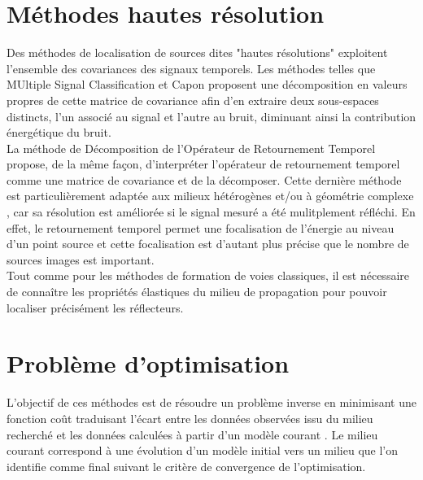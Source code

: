\section{Méthodes hautes résolution}


Des méthodes de localisation de sources dites "hautes résolutions" exploitent l'ensemble des covariances des signaux temporels. Les méthodes telles que MUltiple Signal Classification \citep{schmidt} et Capon \citep{capon} proposent une décomposition en valeurs propres de cette matrice de covariance afin d'en extraire deux sous-espaces distincts, l'un associé au signal et l'autre au bruit, diminuant ainsi la contribution énergétique du bruit. \\

La méthode de Décomposition de l'Opérateur de Retournement Temporel \citep{prada_dort} propose, de la même façon, d'interpréter l'opérateur de retournement temporel comme une matrice de covariance et de la décomposer. Cette dernière méthode est particulièrement adaptée aux milieux hétérogènes et/ou à géométrie complexe , car sa résolution est améliorée si le signal mesuré a été mulitplement réfléchi. En effet, le retournement temporel permet une focalisation de l'énergie au niveau d'un point source et cette focalisation est d'autant plus précise que le nombre de sources images est important. \\
  

Tout comme pour les méthodes de formation de voies classiques, il est nécessaire de connaître les propriétés élastiques du milieu de propagation pour pouvoir localiser précisément les réflecteurs.\\


\section{Problème d'optimisation}

L'objectif de ces méthodes est de résoudre un problème inverse en minimisant une fonction coût traduisant l'écart entre les données observées issu du milieu recherché et les données calculées à partir d'un modèle courant \citep{tarantola_book}. Le milieu courant correspond à une évolution d'un modèle initial vers un milieu que l'on identifie comme final suivant le critère de convergence de l'optimisation.\\


